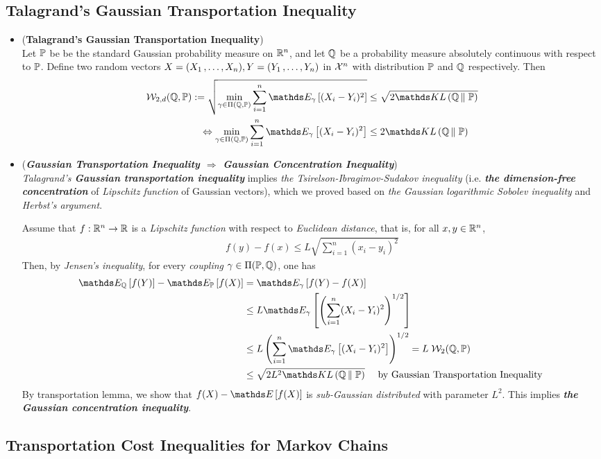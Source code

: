 \documentclass[11pt]{article}
\begin{document}
\subsection{Talagrand's Gaussian Transportation Inequality}
\begin{itemize}
\item \begin{theorem} (\textbf{Talagrand's Gaussian Transportation Inequality}) \citep{boucheron2013concentration}\\
Let ${\mathbb P}$ be be the standard Gaussian probability measure on ${\mathbb R}^n$, and let ${\mathbb Q}$ be a probability measure absolutely continuous with respect to ${\mathbb P}$. Define two random vectors $X = (X_1 \,{,}\ldots{,}\, X_n), Y = (Y_1 \,{,}\ldots{,}\, Y_n)$ in ${\mathcal X}^n$ with distribution ${\mathbb P}$ and ${\mathbb Q}$ respectively.  Then
\begin{align}
\cW_{2, d}(\bQ, \bP) := \sqrt{\min_{\gamma \in \Pi(\bQ, \bP)}\sum_{i=1}^n\E{\gamma}{(X_i - Y_i)^2}   } &\le \sqrt{2\kl{\bQ}{\bP}} \label{ineqn: talagrand_gaussian_transport_cost_inequality} \\
\Leftrightarrow  \min_{\gamma \in \Pi(\bQ, \bP)}\sum_{i=1}^n\E{\gamma}{(X_i - Y_i)^2}   &\le 2\kl{\bQ}{\bP} \nonumber
\end{align}
\end{theorem}

\item \begin{remark} (\textbf{\emph{Gaussian Transportation Inequality $\Rightarrow$ Gaussian Concentration Inequality}}) \citep{boucheron2013concentration}\\
\emph{Talagrand's \textbf{Gaussian transportation inequality}} implies \emph{the Tsirelson-Ibragimov-Sudakov inequality} (i.e. \emph{\textbf{the dimension-free concentration}} of \emph{Lipschitz function} of Gaussian vectors), which we proved based on \emph{the Gaussian logarithmic Sobolev inequality} and \emph{Herbst's argument}.

Assume that $f: {\mathbb R}^n \to {\mathbb R}$ is a \emph{Lipschitz function} with respect to \emph{Euclidean distance}, that is, for all $x, y \in {\mathbb R}^n$,
\begin{align*}
f(y) - f(x) \le L \sqrt{\sum_{i=1}^n (x_i - y_i)^2}
\end{align*} Then, by \emph{Jensen's inequality}, for every \emph{coupling} $\gamma \in \Pi({\mathbb P}, {\mathbb Q})$, one has
\begin{align*}
\E{\bQ}{f(Y)} - \E{\bP}{f(X)} &= \E{\gamma}{f(Y) - f(X)} \\
&\le L \E{\gamma}{\paren{\sum_{i=1}^n (X_i - Y_i)^2}^{1/2}} \\
&\le L \paren{\sum_{i=1}^n \E{\gamma}{(X_i - Y_i)^2}}^{1/2} = L\; \cW_{2}(\bQ, \bP) \\
&\le \sqrt{2 L^2 \kl{\bQ}{\bP}} \quad \text{ by Gaussian Transportation Inequality }
\end{align*} By transportation lemma, we show that $f(X) - \E{}{f(X)}$ is \emph{sub-Gaussian distributed} with parameter $L^2$. This implies \emph{\textbf{the Gaussian concentration inequality}}.
\end{remark}
\end{itemize}
\subsection{Transportation Cost Inequalities for Markov Chains}

\newpage


\end{document}
